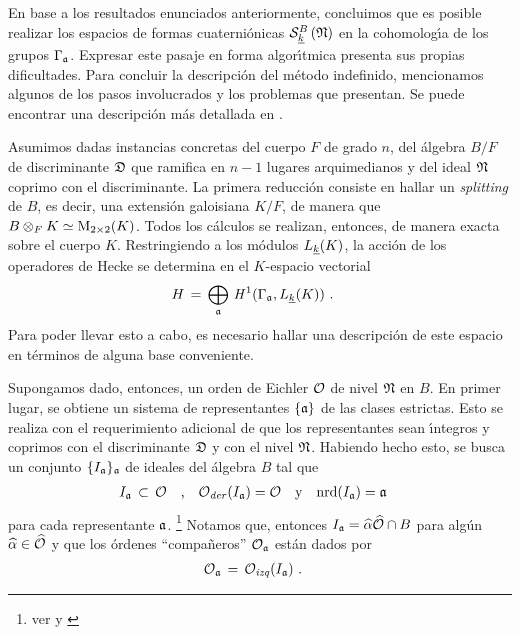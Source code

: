 En base a los resultados enunciados anteriormente, concluimos que es posible
realizar los espacios de formas cuaterni\'{o}nicas $\spitzH[B]{k}{\frak{N}}$
en la cohomolog\'{\i}a de los grupos $\Gamma_{\frak{a}}$.
Expresar este pasaje en forma algor\'{\i}tmica presenta sus propias
dificultades. Para concluir la descripci\'{o}n del m\'{e}todo indefinido,
mencionamos algunos de los pasos involucrados y los problemas que presentan. Se
puede encontrar una descripci\'{o}n m\'{a}s detallada en
\cite{GreenbergVoight}.

Asumimos dadas instancias concretas del cuerpo $F$ de grado $n$, del
\'{a}lgebra $B/F$ de discriminante $\frak{D}$ que ramifica en $n-1$ lugares
arquimedianos y del ideal $\frak{N}$ coprimo con el discriminante. La primera
reducci\'{o}n consiste en hallar un \emph{splitting} de $B$, es decir, una
extensi\'{o}n galoisiana $K/F$, de manera que
$B\otimes_{F}K\simeq\MM_{2\times 2}(K)$. Todos los c\'{a}lculos se realizan,
entonces, de manera exacta sobre el cuerpo $K$. Restringiendo a los m\'{o}dulos
$L_{\peso{k}}(K)$, la acci\'{o}n de los operadores de Hecke se determina en el
$K$-espacio vectorial
\begin{align*}
	H & \,=\,\bigoplus_{\frak{a}}\,\cohomolo[1]{%
		\Gamma_{\frak{a}},L_{\peso{k}}(K)}
	\text{ .}
\end{align*}
%
Para poder llevar esto a cabo, es necesario hallar una descripci\'{o}n de este
espacio en t\'{e}rminos de alguna base conveniente.

Supongamos dado, entonces, un orden de Eichler $\cal{O}$ de nivel $\frak{N}$ en
$B$. En primer lugar, se obtiene un sistema de representantes $\{\frak{a}\}$ de
las clases estrictas. Esto se realiza con el requerimiento adicional de que los
representantes sean \'{\i}ntegros y coprimos con el discriminante $\frak{D}$ y
con el nivel $\frak{N}$. Habiendo hecho esto, se busca un conjunto
$\{I_{\frak{a}}\}_{\frak{a}}$ de ideales del \'{a}lgebra $B$ tal que
\begin{align*}
	I_{\frak{a}}\,\subset\,\cal{O} & \quad\text{,}\quad
		\Oder(I_{\frak{a}})=\cal{O} \quad\text{y}\quad
		\nrd(I_{\frak{a}})=\frak{a}
\end{align*}
%
para cada representante $\frak{a}$.%
\footnote{
	ver \cite[Ch.~II, Thm.~2.3]{Vigneras} y
	\cite[Lemma 7.2]{KirschmerVoight}
}
Notamos que, entonces $I_{\frak{a}}=\hhat{\alpha}\Adfin{\cal{O}}\cap B$ para
alg\'{u}n $\hhat{\alpha}\in\Adfin{\cal{O}}$ y que los \'{o}rdenes
``compa\~{n}eros'' $\cal{O}_{\frak{a}}$ est\'{a}n dados por
\begin{align*}
	\cal{O}_{\frak{a}} & \,=\,\Oizq(I_{\frak{a}})
	\text{ .}
\end{align*}
%

